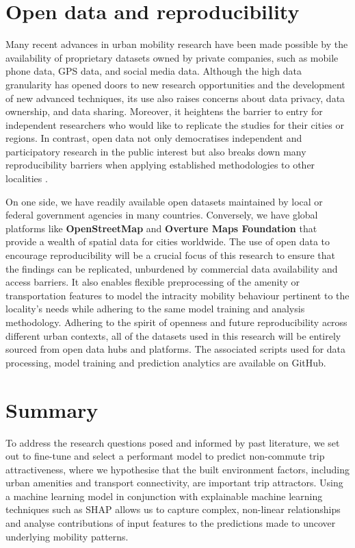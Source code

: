 \section{Open data and reproducibility}

Many recent advances in urban mobility research have been made possible by the availability of proprietary datasets owned by private companies, such as mobile phone data, GPS data, and social media data. Although the high data granularity has opened doors to new research opportunities and the development of new advanced techniques, its use also raises concerns about data privacy, data ownership, and data sharing. Moreover, it heightens the barrier to entry for independent researchers who would like to replicate the studies for their cities or regions. In contrast, open data not only democratises independent and participatory research in the public interest but also breaks down many reproducibility barriers when applying established methodologies to other localities \citep{yadavRoleOpenData2017}.

On one side, we have readily available open datasets maintained by local or federal government agencies in many countries. Conversely, we have global platforms like \textbf{OpenStreetMap} and \textbf{Overture Maps Foundation} that provide a wealth of spatial data for cities worldwide. The use of open data to encourage reproducibility will be a crucial focus of this research to ensure that the findings can be replicated, unburdened by commercial data availability and access barriers. It also enables flexible preprocessing of the amenity or transportation features to model the intracity mobility behaviour pertinent to the locality's needs while adhering to the same model training and analysis methodology. Adhering to the spirit of openness and future reproducibility across different urban contexts, all of the datasets used in this research will be entirely sourced from open data hubs and platforms. The associated scripts used for data processing, model training and prediction analytics are available on GitHub.

\section{Summary}

To address the research questions posed and informed by past literature, we set out to fine-tune and select a performant model to predict non-commute trip attractiveness, where we hypothesise that the built environment factors, including urban amenities and transport connectivity, are important trip attractors. Using a machine learning model in conjunction with explainable machine learning techniques such as SHAP allows us to capture complex, non-linear relationships and analyse contributions of input features to the predictions made to uncover underlying mobility patterns.